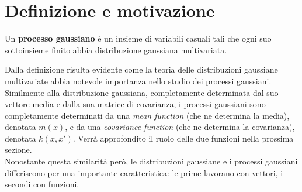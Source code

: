 \newpage


\section{Definizione e motivazione}


\begin{defi}
Un \textbf{processo gaussiano} è un insieme di variabili casuali tali che ogni suo sottoinsieme finito abbia distribuzione gaussiana multivariata.
\end{defi}

Dalla definizione risulta evidente come la teoria delle distribuzioni gaussiane multivariate abbia notevole importanza nello studio dei processi gaussiani.\\
Similmente alla distribuzione gaussiana, completamente determinata dal suo vettore media e dalla sua matrice di covarianza,  i processi gaussiani sono completamente determinati da una \textit{mean function} (che ne determina la media), denotata $m(x)$, e da una \textit{covariance function} (che ne determina la covarianza), denotata $k(x,x')$. Verrà approfondito il ruolo delle due funzioni nella prossima sezione.\\
Nonostante questa similarità però, le distribuzioni gaussiane e i processi gaussiani differiscono per una importante caratteristica: le prime lavorano con vettori, i secondi con funzioni.

\vspace{0.5cm}

